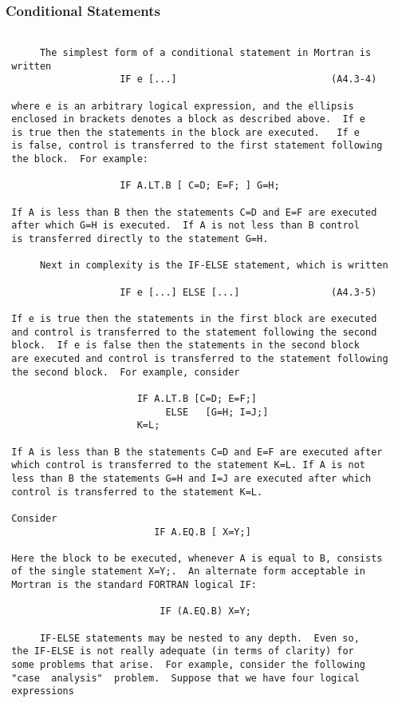  \subsubsection{Conditional Statements}
 \begin{verbatim}
 
      The simplest form of a conditional statement in Mortran is
 written
                    IF e [...]                           (A4.3-4)
 
 where e is an arbitrary logical expression, and the ellipsis
 enclosed in brackets denotes a block as described above.  If e
 is true then the statements in the block are executed.   If e
 is false, control is transferred to the first statement following
 the block.  For example:
 
                    IF A.LT.B [ C=D; E=F; ] G=H;
 
 If A is less than B then the statements C=D and E=F are executed
 after which G=H is executed.  If A is not less than B control
 is transferred directly to the statement G=H.
 
      Next in complexity is the IF-ELSE statement, which is written
 
                    IF e [...] ELSE [...]                (A4.3-5)
 
 If e is true then the statements in the first block are executed
 and control is transferred to the statement following the second
 block.  If e is false then the statements in the second block
 are executed and control is transferred to the statement following
 the second block.  For example, consider
 
                       IF A.LT.B [C=D; E=F;]
                            ELSE   [G=H; I=J;]
                       K=L;
 
 If A is less than B the statements C=D and E=F are executed after
 which control is transferred to the statement K=L. If A is not
 less than B the statements G=H and I=J are executed after which
 control is transferred to the statement K=L.
 
 Consider
                          IF A.EQ.B [ X=Y;]
 
 Here the block to be executed, whenever A is equal to B, consists
 of the single statement X=Y;.  An alternate form acceptable in
 Mortran is the standard FORTRAN logical IF:
 
                           IF (A.EQ.B) X=Y;
 
      IF-ELSE statements may be nested to any depth.  Even so,
 the IF-ELSE is not really adequate (in terms of clarity) for
 some problems that arise.  For example, consider the following
 "case  analysis"  problem.  Suppose that we have four logical
 expressions
 

\end{verbatim}
